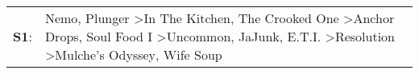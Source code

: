 \begin{supertabular}{p{0.03\textwidth}p{0.92\textwidth}}
 \textbf{S1}:  &  Nemo\textsuperscript{}, \enspace Plunger\textsuperscript{} \textgreater \enspace In The Kitchen\textsuperscript{}, \enspace The Crooked One\textsuperscript{} \textgreater \enspace Anchor Drops\textsuperscript{}, \enspace Soul Food I\textsuperscript{} \textgreater \enspace Uncommon\textsuperscript{}, \enspace JaJunk\textsuperscript{}, \enspace E.T.I.\textsuperscript{} \textgreater \enspace Resolution\textsuperscript{} \textgreater \enspace Mulche's Odyssey\textsuperscript{}, \enspace Wife Soup\textsuperscript{}  \enspace  \\
\end{supertabular}
